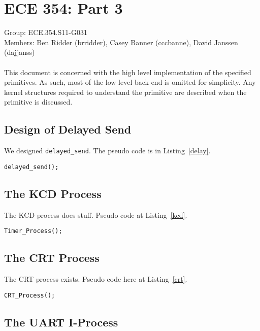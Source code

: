 \documentclass[oneside]{article}
\begin{document}
\lstset{language=C, 
        frame=single, 
        breaklines=true,
        basicstyle=\small\ttfamily,
        columns=fullflexible}
\section*{ECE 354: Part 3}
Group: ECE.354.S11-G031 \\
Members: Ben Ridder (brridder), Casey Banner (cccbanne), 
David Janssen (dajjanss) \\ \\
This document is concerned with the high level implementation of the 
specified primitives. As such, most of the low level back end is omitted for
simplicity. Any kernel structures required to understand the primitive are
described when the primitive is discussed.

\subsection*{Design of Delayed Send} 
We designed \texttt{delayed\_send}. The pseudo code is in Listing~\ref{delay}.

\begin{lstlisting}
delayed_send();
\end{lstlisting}

\subsection*{The KCD Process}
The KCD process does stuff. Pseudo code at Listing~\ref{kcd}. 

\begin{lstlisting}
Timer_Process();
\end{lstlisting}

\subsection*{The CRT Process}

The CRT process exists. Pseudo code here at Listing~\ref{crt}.

\begin{lstlisting}
CRT_Process();
\end{lstlisting}

\subsection*{The UART I-Process}
\end{document}

